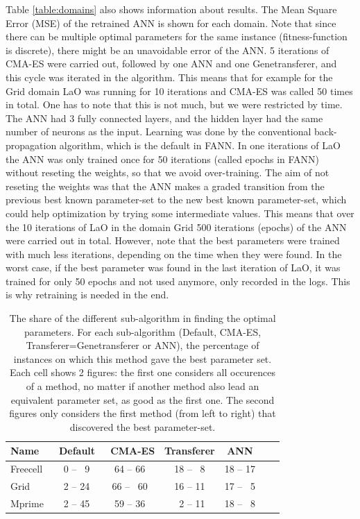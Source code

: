 \documentclass[letterpaper]{article}
\begin{document}
Table \ref{table:domains} also shows information about results. The Mean Square Error (MSE) of the retrained ANN is shown for each domain. Note that since there can be multiple optimal parameters for the same instance (fitness-function is discrete), there might be an unavoidable error of the ANN. 5 iterations of CMA-ES were carried out, followed by one ANN and one Genetransferer, and this cycle was iterated in the algorithm. This means that for example for the Grid domain LaO was running for 10 iterations and CMA-ES was called 50 times in total. One has to note that this is not much, but we were restricted by time. The ANN had 3 fully connected layers, and the hidden layer had the same number of neurons as the input. Learning was done by the conventional back-propagation algorithm, which is the default in FANN. In one iterations of LaO the ANN was only trained once for 50 iterations (called epochs in FANN) without reseting the weights, so that we avoid over-training. The aim of not reseting the weights was that the ANN makes a graded transition from the previous best known parameter-set to the new best known parameter-set, which could help optimization by trying some intermediate values. This means that over the 10 iterations of LaO in the domain Grid 500 iterations (epochs) of the ANN were carried out in total. However, note that the best parameters were trained with much less iterations, depending on the time when they were found. In the worst case, if the best parameter was found in the last iteration of LaO, it was trained for only 50 epochs and not used anymore, only recorded in the logs. This is why retraining is needed in the end.

 \begin{table}[tb!]
\centering
\begin{tabular}{l c c c c c c}
\hline\hline
Name & \ Default & \ CMA-ES &  Transferer & ANN \\ 
\hline
Freecell & ~0 -- ~9& 64 -- 66  & 18 -- ~8  & 18 -- 17     \\
Grid & ~2 -- 24 & 66 -- ~60  & 16 -- 11 & 17 -- ~5  &    \\
Mprime &  ~2 -- 45& 59 -- 36 & ~2 -- 11  & 18 -- ~8  &    \\
\hline
\end{tabular}
\caption{The share of the different sub-algorithm in finding the optimal parameters. For each sub-algorithm (Default, CMA-ES, Transferer=Genetransferer or ANN), the percentage of instances on which this method gave the best parameter set. Each cell shows 2 figures: the first one considers all occurences of a method, no matter if another method also lead an equivalent parameter set, as good as the first one. The second figures only considers the first method (from left to right) that discovered the best parameter-set.}
\label{table:hints}
\end{table} 
\end{document}
